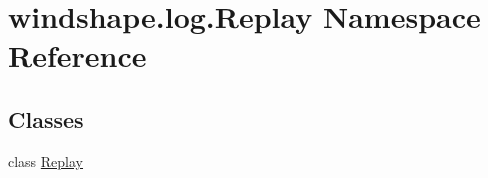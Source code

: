 \hypertarget{namespacewindshape_1_1log_1_1_replay}{}\section{windshape.\+log.\+Replay Namespace Reference}
\label{namespacewindshape_1_1log_1_1_replay}
\subsection*{Classes}
\begin{DoxyCompactItemize}
\item 
class \mbox{\hyperlink{classwindshape_1_1log_1_1_replay_1_1_replay}{Replay}}
\end{DoxyCompactItemize}
